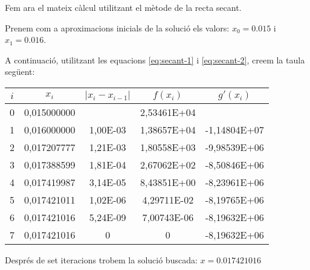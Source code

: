\begin{exemple}
Fem ara el mateix càlcul utilitzant el mètode de la recta secant.

Prenem com a  aproximacions inicials de la solució els valors: $x_0 = \num{0,015}$ i $x_1 = \num{0,016}$.

 A continuació, utilitzant les equacions \eqref{eq:secant-1} i \eqref{eq:secant-2}, creem la taula següent:

\begin{center}
   \centering
   \begin{tabular}{S[table-format=1.0]S[table-format=2.9]S[table-format=2.2e+2]
   S[table-format=2.5e+2]S[table-format=+3.5e+2]}
    & {$x_i$}  & {$|x_i - x_{i-1}|$} & {$f(x_i)$} & {$g'(x_i)$} \\
   	&  0,015000000 & {}       & 2,53461E+04 & {}             \\
       1	&  0,016000000 & 1,00E-03 & 1,38657E+04 & -1,14804E+07 \\
       2	&  0,017207777 & 1,21E-03 & 1,80558E+03 & -9,98539E+06 \\
       3	&  0,017388599 & 1,81E-04 & 2,67062E+02 & -8,50846E+06 \\
       4	&  0,017419987 & 3,14E-05 & 8,43851E+00 & -8,23961E+06 \\
       5	&  0,017421011 & 1,02E-06 & 4,29711E-02 & -8,19765E+06 \\
       6	&  0,017421016 & 5,24E-09 & 7,00743E-06 & -8,19632E+06 \\
       7	&  0,017421016 & 0        & 0           & -8,19632E+06 \\
   \bottomrule[1pt]
   \end{tabular}
\end{center}


Després de set iteracions trobem la solució buscada: $x=\num{0,017421016}$


\end{exemple} 